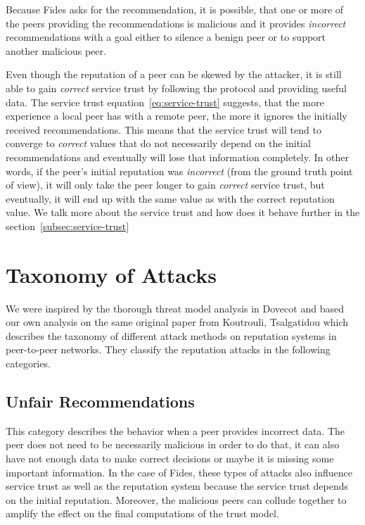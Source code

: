Because Fides asks for the recommendation, it is possible, that one or more of the peers providing the recommendations is malicious and it provides \textit{incorrect} recommendations with a goal either to silence a benign peer or to support another malicious peer.

Even though the reputation of a peer can be skewed by the attacker, it is still able to gain \textit{correct} service trust by following the protocol and providing useful data.
The service trust equation~\ref{eq:service-trust} suggests, that  the more experience a local peer has with a remote peer, the more it ignores the initially received recommendations.
This means that the service trust will tend to converge to \textit{correct} values that do not necessarily depend on the initial recommendations and eventually will lose that information completely.
In other words, if the peer's initial reputation was \textit{incorrect} (from the ground truth point of view), it will only take the peer longer to gain \textit{correct} service trust, but eventually, it will end up with the same value as with the correct reputation value.
We talk more about the service trust and how does it behave further in the section~\ref{subsec:service-trust}

\section{Taxonomy of Attacks}
\label{sec:taxonomy-of-attacks}
We were inspired by the thorough threat model analysis in Dovecot \cite{dita}  and based our own analysis on the same original paper from Koutrouli, Tsalgatidou \cite{KOUTROULI201247} which describes the taxonomy of different attack methods on reputation systems in peer-to-peer networks.
They classify the reputation attacks in the following categories.

\subsection{Unfair Recommendations}
\label{subsec:unfair-recommendations}
This category describes the behavior when a peer provides incorrect data.
The peer does not need to be necessarily malicious in order to do that, it can also have not enough data to make correct decisions or maybe it is missing some important information.
In the case of Fides, these types of attacks also influence service trust as well as the reputation system because the service trust depends on the initial reputation.
Moreover, the malicious peers can collude together to amplify the effect on the final computations of the trust model.

